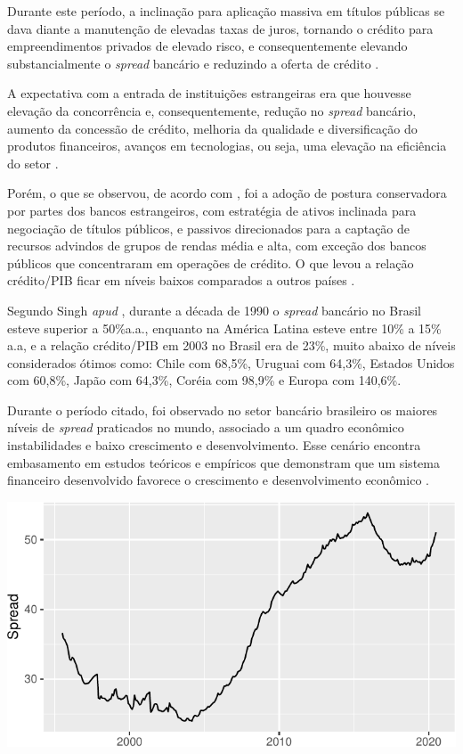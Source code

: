\documentclass[12pt,openright,oneside,a4paper,chapter=TITLE,section=TITLE,subsection=Title,english,french,spanish,portugues,sumario=tradicional]{04-class-files/abntex2}
\begin{document}
Durante este período, a inclinação para aplicação massiva em títulos públicas se dava diante a manutenção de elevadas taxas de juros, tornando o crédito para empreendimentos privados de elevado risco, e consequentemente elevando substancialmente o \emph{spread} bancário e reduzindo a oferta de crédito \cite{camargo:2009}.

A expectativa com a entrada de instituições estrangeiras era que houvesse elevação da concorrência e, consequentemente, redução no \emph{spread} bancário, aumento da concessão de crédito, melhoria da qualidade e diversificação do produtos financeiros, avanços em tecnologias, ou seja, uma elevação na eficiência do setor \cite{camargo:2009}.

Porém, o que se observou, de acordo com \textcite{camargo:2009}, foi a adoção de postura conservadora por partes dos bancos estrangeiros, com estratégia de ativos inclinada para negociação de títulos públicos, e passivos direcionados para a captação de recursos advindos de grupos de rendas média e alta, com exceção dos bancos públicos que concentraram em operações de crédito. O que levou a relação crédito/PIB ficar em níveis baixos comparados a outros países \cite{camargo:2009, leal:2006}.

Segundo Singh \emph{apud} \textcite{leal:2006}, durante a década de 1990 o \emph{spread} bancário no Brasil esteve superior a 50\%a.a., enquanto na América Latina esteve entre 10\% a 15\% a.a, e a relação crédito/PIB em 2003 no Brasil era de 23\%, muito abaixo de níveis considerados ótimos como: Chile com 68,5\%, Uruguai com 64,3\%, Estados Unidos com 60,8\%, Japão com 64,3\%, Coréia com 98,9\% e Europa com 140,6\%.

Durante o período citado, foi observado no setor bancário brasileiro os maiores níveis de \emph{spread} praticados no mundo, associado a um quadro econômico instabilidades e baixo crescimento e desenvolvimento. Esse cenário encontra embasamento em estudos teóricos e empíricos que demonstram que um sistema financeiro desenvolvido favorece o crescimento e desenvolvimento econômico \cite{levine:1997, matos:2003}.


\begin{center}\includegraphics{12-exportedfigures/credit gdp-1} \end{center}
\end{document}
